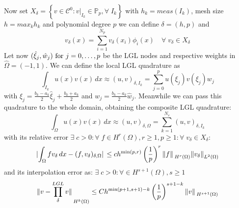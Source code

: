 Now set \(X_\delta = \left\{ v \in \mathcal{C}^0 : v\vert_{I_k} \in \mathbb{P}_p, \forall \; I_k \right\}\) with \(h_k = meas(I_k)\), mesh size \(h =  max_k h_k\) and polynomial degree \(p\) we can define \(\delta = (h,p)\) and 
\[
    v_\delta(x) = \sum_{i=1}^{N_p} v_\delta (x_i)\phi_i(x) \quad \forall \; v_\delta \in X_\delta
\]
Let now \((\hat{\xi}_j, \hat{w}_j) \text{ for } j = 0, \ldots, p\) be the LGL nodes and respective weights in \(\hat{\Omega} = (-1,1)\).
We can define the local LGL quadrature as
\[
    \int_{I_k} u(x)v(x) \, dx \approx (u,v)_{\delta, I_k} = \sum_{j=0}^{p} u(\xi_j)v(\xi_j)w_j
\]
with \(\xi_j = \frac{b_k - a_k}{2}\hat{\xi}_j + \frac{b_k + a_k}{2}\) and \(w_j = \frac{b_k -a_k}{2}\hat{w}_j\).
Meanwhile we can pass this quadrature to the whole domain, obtaining the composite LGL quadrature:
\[
    \int_\Omega u(x)v(x)\, dx \approx (u,v)_{\delta, \Omega} = \sum_{k=1}^{N_e} (u,v)_{\delta, I_k}
\]
with its relative error \(\exists \; c > 0 : \forall \; f \in H^r(\Omega), r\geq 1, p \geq 1 : \forall \; v_\delta \in X_\delta \):
\[
    \abs*{\int_{\Omega} fv_\delta \, dx - (f, v_\delta)_{\delta, \Omega}} \leq c h^{\min(p,r)}\left( \frac{1}{p} \right)^r \norm*{f}_{H^r(\Omega)}\norm{v_\delta}_{L^2(\Omega)}
\]
and its interpolation error as: \(\exists \; c > 0 : \forall \in H^{s+1}(\Omega), s \geq 1\)
\[
    \norm*{v - \prod_{\delta}^{LGL}v}_{H^k(\Omega)} \leq Ch^{\min(p+1, s+1)-k}\left( \frac{1}{p} \right)^{s+1-k}\norm*{v}_{H^{s+1}(\Omega)}
\] 

